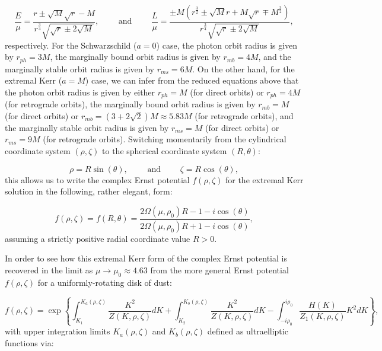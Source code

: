 \documentclass{article}
\begin{document}
\begin{equation}
\frac{E}{\mu} = \frac{r \pm \sqrt{M} \sqrt{r} - M}{r^{\frac{3}{4}} \sqrt{\sqrt{r} \pm 2 \sqrt{M}}}, \qquad \text{ and } \qquad \frac{L}{\mu} = \frac{\pm M \left( r^{\frac{3}{2}} \pm \sqrt{M} r + M \sqrt{r} \mp M^{\frac{3}{2}} \right)}{r^{\frac{3}{4}} \sqrt{\sqrt{r} \pm 2 \sqrt{M}}},
\end{equation}
respectively. For the Schwarzschild (${a = 0}$) case, the photon orbit radius is given by ${r_{ph} = 3M}$, the marginally bound orbit radius is given by ${r_{mb} = 4M}$, and the marginally stable orbit radius is given by ${r_{ms} = 6M}$. On the other hand, for the extremal Kerr (${a = M}$) case, we can infer from the reduced equations above that the photon orbit radius is given by either ${r_{ph} = M}$ (for direct orbits) or ${r_{ph} = 4M}$ (for retrograde orbits), the marginally bound orbit radius is given by ${r_{mb} = M}$ (for direct orbits) or ${r_{mb} = \left( 3 + 2 \sqrt{2} \right) M \approx 5.83 M}$ (for retrograde orbits), and the marginally stable orbit radius is given by ${r_{ms} = M}$ (for direct orbits) or ${r_{ms} = 9M}$ (for retrograde orbits). Switching momentarily from the cylindrical coordinate system ${\left( \rho, \zeta \right)}$ to the spherical coordinate system ${\left( R, \theta \right)}$:

\begin{equation}
\rho = R \sin \left( \theta \right), \qquad \text{ and } \qquad \zeta = R \cos \left( \theta \right),
\end{equation}
this allows us to write the complex Ernst potential ${f \left( \rho, \zeta \right)}$ for the extremal Kerr solution in the following, rather elegant, form:

\begin{equation}
f \left( \rho, \zeta \right) = f \left( R, \theta \right) = \frac{2 \Omega \left( \mu, \rho_0 \right) R - 1 - i \cos \left( \theta \right)}{2 \Omega \left( \mu, \rho_0 \right) R + 1 - i \cos \left( \theta \right)},
\end{equation}
assuming a strictly positive radial coordinate value ${R > 0}$.

In order to see how this extremal Kerr form of the complex Ernst potential is recovered in the limit as ${\mu \to \mu_0 \approx 4.63}$ from the more general Ernst potential ${f \left( \rho, \zeta \right)}$ for a uniformly-rotating disk of dust:

\begin{equation}
f \left( \rho, \zeta \right) = \exp \left\lbrace \int_{K_1}^{K_a \left( \rho, \zeta \right)} \frac{K^2}{Z \left( K, \rho, \zeta \right)} d K + \int_{K_2}^{K_b \left( \rho, \zeta \right)} \frac{K^2}{Z \left( K, \rho, \zeta \right)} d K - \int_{- i \rho_0}^{i \rho_0} \frac{H \left( K \right)}{Z_1 \left( K, \rho, \zeta \right)} K^2 d K \right\rbrace,
\end{equation}
with upper integration limits ${K_a \left( \rho, \zeta \right)}$ and ${K_b \left( \rho, \zeta \right)}$ defined as ultraelliptic functions via:
\end{document}
